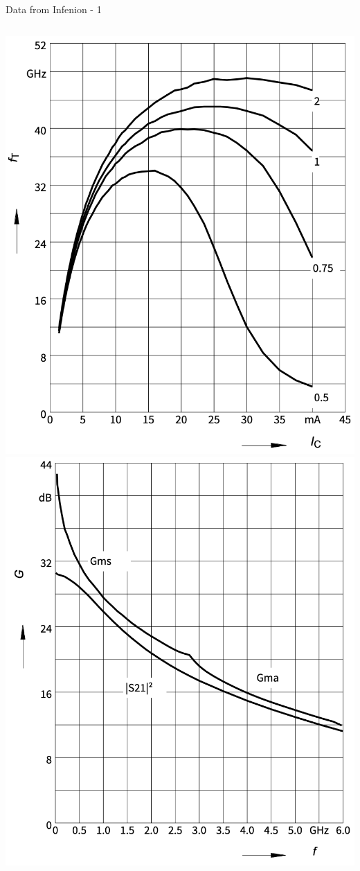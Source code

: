 \documentclass{beamer}
\begin{document}
\begin{frame}{Data from Infenion - 1}
\begin{columns}
  \includegraphics[width=\linewidth]{images/transition_freq_vs_f.png}
  \includegraphics[width=\linewidth]{images/gain_vs_f.png}
\end{columns}
\end{frame}
\end{document}
